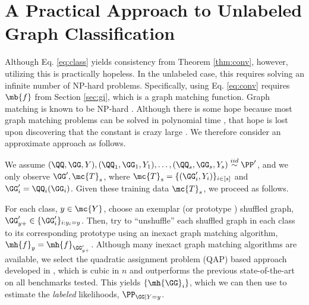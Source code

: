 \documentclass[10pt,journal,cspaper,compsoc]{IEEEtran}
\begin{document}

\section{A Practical Approach to Unlabeled Graph Classification} %
\label{sec:a_practical_approach_to_unlabeled_graph_classification}

Although Eq. \ref{eq:class} yields consistency from Theorem \ref{thm:conv}, however, utilizing this is practically hopeless.  In the unlabeled case, this requires solving an infinite number of NP-hard problems.  Specifically, using Eq. \ref{eq:conv} requires $\mb{f}$ from Section \ref{sec:gi}, which is a graph matching function.  Graph matching is known to be NP-hard \cite{Conte04}.  Although there is some hope because most graph matching problems can be solved in polynomial time \cite{Conte04}, that hope is lost upon discovering that the constant is crazy large \cite{Conte04}.  We therefore consider an approximate approach as follows.

We assume $(\QQ,\GG,Y), (\QQ_1,\GG_1,Y_1),\ldots, (\QQ_s,\GG_s,Y_s) \overset{iid}{\sim} \PP'$, and we only observe $\GG', \mc{T}_s$, where  $\mc{T}_s=\{(\GG_i',Y_i)\}_{i \in [s]}$ and $\GG_i'=\QQ_i(\GG_i)$. Given these training data $\mc{T}_s$, we proceed as follows.  

For each class, $y \in \mc{Y}$, choose an exemplar (or prototype \cite{Bunke2011}) shuffled graph, $\GG'_{y+} \in \{\GG_i'\}_{i: y_i=y}$.  Then, try to ``unshuffle'' each shuffled graph in each class to its corresponding prototype using an inexact graph matching algorithm, $\mh{f}_y=\mh{f}_{\GG'_{y+}}$.  Although many inexact graph matching algorithms are available, we select the quadratic assignment problem (QAP) based approach developed in \cite{VP11QAP}, which is cubic in $n$ and outperforms the previous state-of-the-art on all benchmarks tested.  This yields $\{\mh{\GG}_i\}$, which we can then use to estimate the \emph{labeled} likelihoods, $\PP_{\GG|Y=y}$.   
\end{document}
